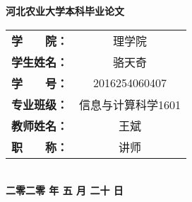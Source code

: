 \begin{center}
    \vspace{2cm}
    \begin{spacing}{2.0}
        \textbf{河北农业大学本科毕业论文}
    \end{spacing}
    \vfill
    \songti
    \begin{tabular}[b]{cc}
        \rule{0pt}{1cm}\textbf{学　　院：} & 理学院             \\\cline{2-2}
        \rule{0pt}{1cm}\textbf{学生姓名：} & 骆天奇             \\\cline{2-2}
        \rule{0pt}{1cm}\textbf{学　　号：} & 2016254060407      \\\cline{2-2}
        \rule{0pt}{1cm}\textbf{专业班级：} & 信息与计算科学1601 \\\cline{2-2}
        \rule{0pt}{1cm}\textbf{教师姓名：} & 王斌               \\\cline{2-2}
        \rule{0pt}{1cm}\textbf{职　　称：} & 讲师               \\\cline{2-2}
    \end{tabular}
    \\
    \vspace{3cm}
    \textbf{二零二零 年 五 月 二十 日}
\end{center}
\clearpage